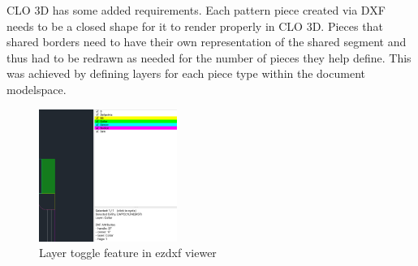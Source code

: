 CLO 3D has some added requirements. Each pattern piece created via DXF needs to be a closed shape for it to render properly in CLO 3D. Pieces that shared borders need to have their own representation of the shared segment and thus had to be redrawn as needed for the number of pieces they help define. This was achieved by defining layers for each piece type within the document modelspace.

\begin{figure} [H] %
    \centering %
    \includegraphics[width = 0.4\textwidth]{Images/dxf viewer.png} %
    \caption{Layer toggle feature in ezdxf viewer}
\end{figure}


